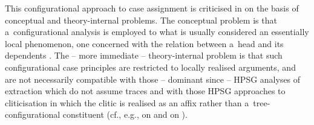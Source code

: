 \documentclass[output=paper]{langsci/langscibook}
\begin{document}
This configurational approach to case assignment is criticised in \citealt{prze:96,Prze99b,Prze99} on the basis of conceptual and theory-internal problems.  The conceptual problem is that a~configurational analysis is employed to what is usually considered an essentially local phenomenon, one concerned with the relation between a~head and its dependents \citep{blak:94}.  The – more immediate – theory-internal problem is that such configurational case principles are restricted to locally realised arguments, and are not necessarily compatible with those – dominant since \citealt[Chapter~9]{ps2} – HPSG analyses of extraction which do not assume traces and with those HPSG approaches to cliticisation in which the clitic is realised as an affix rather than a~tree-configurational constituent (cf., e.g., \citealt{MS97a-u} on  and \citealt{Monachesi99a-u} on ).
\end{document}
